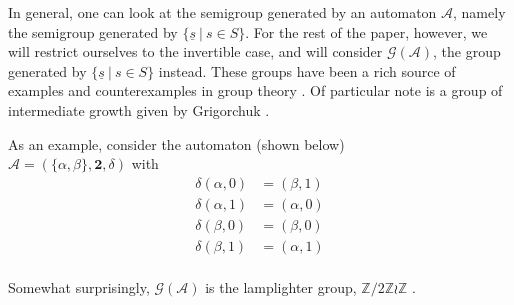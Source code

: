 \documentclass[12pt]{article}
\newcommand{\A}{\mathcal{A}}
\newcommand{\G}{\mathcal{G}}
\newcommand{\Z}{\mathbb{Z}}
\newcommand{\2}{\textbf{2}}
\begin{document}
In general, one can look at the semigroup generated by an automaton $\A$,
namely the semigroup generated by $\{ \underline{s}~|~s \in S \}$.
For the rest of the paper, however, we will restrict ourselves to the
invertible case, and will consider $\G(\A)$, the group generated by 
$\{ \underline{s}~|~s \in S \}$ instead. These groups have been a rich
source of examples and counterexamples in group theory 
\cite{Nekrashevych05:self_similar_groups
     ,Sidki00:one_rooted_trees
     ,GrigorchukNS00:automata_groups
     }. 
Of particular note is a group of intermediate growth given by Grigorchuk 
\cite{GrigorchukNS00:automata_groups}.


As an example, consider the automaton (shown below)\\
$\A = (\{ \alpha, \beta \}, \2, \delta)$
with 
\begin{align*}
  \delta(\alpha,0)   &= (\beta,1)\\
  \delta(\alpha,1)   &= (\alpha,0)\\
  \delta(\beta,0) &= (\beta,0)\\
  \delta(\beta,1) &= (\alpha,1)\\
\end{align*}

\begin{center}
\end{center}

Somewhat surprisingly, $\G(\A)$ is the lamplighter group, $\Z/2\Z \wr \Z$
\cite{GrigorchukZuk01:lamplighter}.
\end{document}
